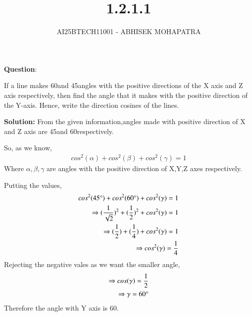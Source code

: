 \documentclass[journal]{IEEEtran}
\renewcommand{\thefigure}{\theenumi}
\renewcommand{\thetable}{\theenumi}
\numberwithin{equation}{enumi}
\numberwithin{figure}{enumi}
\renewcommand{\thetable}{\theenumi}
\begin{document}

\vspace{3cm}

\title{1.2.1.1}
\author{AI25BTECH11001 - ABHISEK MOHAPATRA}
{\let\newpage\relax\maketitle}
\renewcommand{\thefigure}{\theenumi}
\renewcommand{\thetable}{\theenumi}

		\textbf{Question}:

		\noindent If a line makes 60\degree and 45\degree angles with the positive directions of the X axis and Z axis respectively, then find the angle that it makes with the positive direction of the Y-axis. Hence, write the direction cosines of the lines.

		\textbf{Solution:} From the given information,angles made with positive direction of X and Z axis are 45\degree and 60\degree respectively.
		
		So, as we know,
		\begin{align}
			cos^2(\alpha) + cos^2(\beta) + cos^2(\gamma) = 1 
		\end{align}
		Where $\alpha,\beta,\gamma$ are angles with the positive direction of X,Y,Z axes respectively.


		Putting the values, 
		\begin{align}
			cos^2(45\degree) + cos^2(60\degree) + cos^2(\gamma) = 1 
			\\
			\Rightarrow	(\frac{1}{\sqrt{2}})^2 + (\frac{1}{2})^2 + cos^2(\gamma) = 1
			\\
			\Rightarrow	(\frac{1}{{2}}) + (\frac{1}{4}) + cos^2(\gamma) = 1
			\\
			\Rightarrow	cos^2(\gamma) = \frac{1}{4}
		\end{align}
		Rejecting the negative vales as we want the smaller angle,
		\begin{align}
			\Rightarrow	cos(\gamma) = \frac{1}{2}
			\\
			\Rightarrow     \gamma = 60\degree
		\end{align}
		Therefore the angle with Y axis is 60\degree. 
\end{document}
